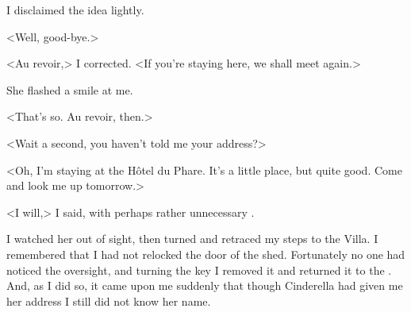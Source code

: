  I disclaimed the idea lightly. 

 <Well, good-bye.> 

 <Au revoir,> I corrected. <If you're staying here, we shall meet again.> 

 She flashed a smile at me. 

 <That's so. Au revoir, then.> 

 <Wait a second, you haven't told me your address?> 

 <Oh, I'm staying at the Hôtel du Phare. It's a little place, but quite good. Come and look me up tomorrow.> 

 <I will,> I said, with perhaps rather unnecessary . 

 I watched her out of sight, then turned and retraced my steps to the Villa. I remembered that I had not relocked the door of the shed. Fortunately no one had noticed the oversight, and turning the key I removed it and returned it to the . And, as I did so, it came upon me suddenly that though Cinderella had given me her address I still did not know her name.
